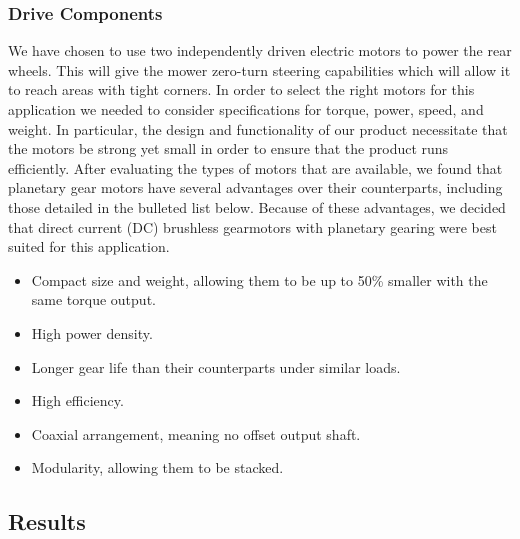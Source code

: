 \documentclass[12pt,letterpaper]{article}
\begin{document}
\subsubsection{Drive Components}

We have chosen to use two independently driven electric motors to power the rear wheels.  This will give the mower zero-turn steering capabilities which will allow it to reach areas with tight corners.  In order to select the right motors for this application we needed to consider specifications for torque, power, speed, and weight. In particular, the design and functionality of our product necessitate that the motors be strong yet small in order to ensure that the product runs efficiently. After evaluating the types of motors that are available, we found that planetary gear motors have several advantages over their counterparts, including those detailed in the bulleted list below. Because of these advantages, we decided that direct current (DC) brushless gearmotors with planetary gearing were best suited for this application. 
\begin{singlespace}
\begin{itemize}
  \item Compact size and weight, allowing them to be up to 50\% smaller with the
  same torque output.
  \item High power density.
  \item Longer gear life than their counterparts under similar loads.
  \item High efficiency.
  \item Coaxial arrangement, meaning no offset output shaft.
  \item Modularity, allowing them to be stacked.
\end{itemize}
\end{singlespace}






\subsection{Results}
\end{document}
